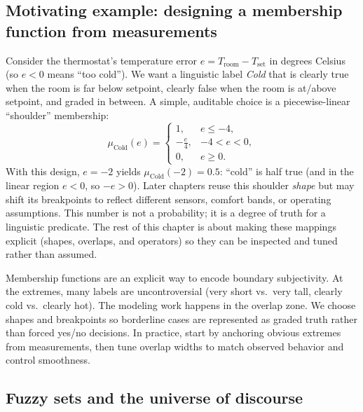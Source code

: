 \subsection{Motivating example: designing a membership function from measurements}
\label{sec:fuzzysets_motivating_example_designing_a_membership_function_from_measurements}

Consider the thermostat's temperature error \(e = T_{\text{room}} - T_{\text{set}}\) in degrees Celsius (so \(e<0\) means ``too cold''). We want a linguistic label \textit{Cold} that is clearly true when the room is far below setpoint, clearly false when the room is at/above setpoint, and graded in between. A simple, auditable choice is a piecewise-linear ``shoulder'' membership:
\begin{equation}
    \mu_{\text{Cold}}(e)=
    \begin{cases}
        1, & e \le -4,\\
        -\frac{e}{4}, & -4 < e < 0,\\
        0, & e \ge 0.
    \end{cases}
    \label{eq:fuzzysets_cold_membership_example}
\end{equation}
With this design, \(e=-2\) yields \(\mu_{\text{Cold}}(-2)=0.5\): ``cold'' is half true (and in the linear region \(e<0\), so \(-e>0\)). Later chapters reuse this shoulder \emph{shape} but may shift its breakpoints to reflect different sensors, comfort bands, or operating assumptions. This number is not a probability; it is a degree of truth for a linguistic predicate. The rest of this chapter is about making these mappings explicit (shapes, overlaps, and operators) so they can be inspected and tuned rather than assumed.

\begin{tcolorbox}[summarybox, title={Author's note: membership design is where judgment enters}]
Membership functions are an explicit way to encode boundary subjectivity. At the extremes, many labels are uncontroversial (very short vs.\ very tall, clearly cold vs.\ clearly hot). The modeling work happens in the overlap zone. We choose shapes and breakpoints so borderline cases are represented as graded truth rather than forced yes/no decisions. In practice, start by anchoring obvious extremes from measurements, then tune overlap widths to match observed behavior and control smoothness.
\end{tcolorbox}

\subsection{Fuzzy sets and the universe of discourse}
\label{sec:fuzzysets_recap_fuzzy_sets_and_the_universe_of_discourse}

